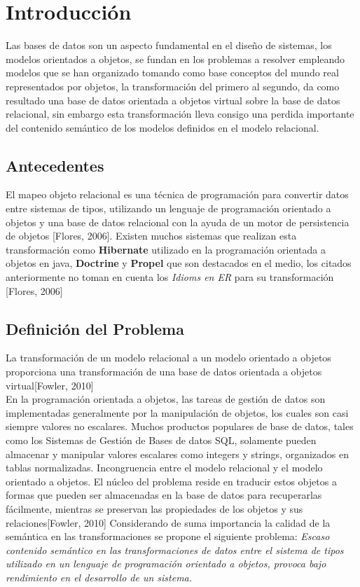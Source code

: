 
\chapter{Introducción}
\noindent Las bases de datos son un aspecto fundamental en el diseño de sistemas, los modelos orientados a objetos,
\noindent se fundan en los problemas a resolver empleando modelos que se han organizado tomando
\noindent como base conceptos del mundo real representados por objetos, la transformación del primero al segundo,
\noindent da como resultado una base de datos orientada a objetos virtual sobre la base de datos relacional,
\noindent sin embargo esta transformación lleva consigo una perdida importante del contenido semántico de los modelos
\noindent definidos en el modelo relacional.
\section{Antecedentes}
\noindent El mapeo objeto relacional es una técnica de programación para convertir datos entre sistemas de tipos,
\noindent utilizando un lenguaje de programación orientado a objetos y una base de datos relacional con la ayuda de un motor
\noindent de persistencia de objetos [Flores, 2006].
\noindent Existen muchos sistemas que realizan esta transformación como \textbf{Hibernate} utilizado en la programación
\noindent orientada a objetos en java, \textbf{Doctrine} y \textbf{Propel} que son destacados en el medio,
\noindent los citados anteriormente no toman en cuenta los \textit{Idioms en ER} para su transformación [Flores, 2006]\\
\section{Definición del Problema}
\noindent La transformación de un modelo relacional a un modelo orientado a objetos proporciona una transformación de una
\noindent base de datos orientada a objetos virtual[Fowler, 2010] \\
\noindent En la programación orientada a objetos, las tareas de gestión de datos son implementadas generalmente por la
\noindent manipulación de objetos, los cuales son casi siempre valores no escalares.
\noindent Muchos productos populares de base de datos, tales como los Sistemas de Gestión de Bases de datos SQL, solamente
\noindent pueden almacenar y manipular valores escalares como integers y strings, organizados en tablas normalizadas.
\noindent Incongruencia entre el modelo relacional y el modelo orientado a objetos. El núcleo del problema reside en traducir
\noindent estos objetos a formas que pueden ser almacenadas en la base de datos para recuperarlas fácilmente, mientras se
\noindent preservan las propiedades de los objetos y sus relaciones[Fowler, 2010]
\noindent Considerando de  suma importancia la calidad de la semántica en las transformaciones se propone el siguiente problema:
\noindent \texbf\textit{Escaso contenido semántico en las transformaciones de datos entre el sistema de tipos utilizado
\noindent en un lenguaje de programación orientado a objetos, provoca bajo rendimiento en el desarrollo de un sistema.}


